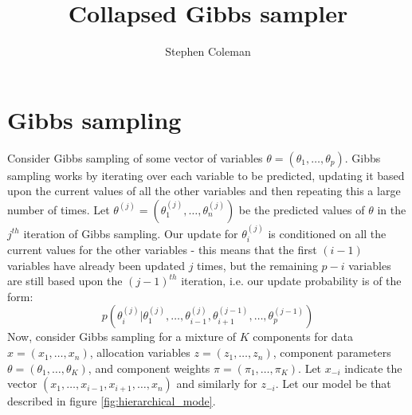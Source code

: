 \documentclass[12pt]{article} %
\title{Collapsed Gibbs sampler}
\author{Stephen Coleman}
\begin{document}
 
	\maketitle
	
	\section{Gibbs sampling}
	
	Consider Gibbs sampling of some vector of variables $\theta=(\theta_1,\ldots,\theta_p)$. Gibbs sampling works by iterating over each variable to be predicted, updating it based upon the current values of all the other variables and then repeating this a large number of times. Let $\theta^{(j)}=(\theta^{(j)}_1,\ldots,\theta^{(j)}_n)$ be the predicted values of $\theta$ in the $j^{th}$ iteration of Gibbs sampling. Our update for $\theta^{(j)}_i$ is conditioned on all the current values for the other variables - this means that the first $(i-1)$ variables have already been updated $j$ times, but the remaining $p - i$ variables are still based upon the $(j-1)^{th}$ iteration, i.e. our update probability is of the form:
	\[
	p\left(\theta^{(j)}_i | \theta^{(j)}_1,\ldots,\theta^{(j)}_{i-1},\theta^{(j-1)}_{i+1},\ldots, \theta^{(j - 1)}_p\right)
	\]
	Now, consider Gibbs sampling for a mixture of $K$ components for data $x=(x_1, \ldots, x_n)$, allocation variables $z=(z_1,\ldots,z_n)$, component parameters $\theta=(\theta_1,\ldots,\theta_K)$, and component weights $\pi=(\pi_1,\ldots,\pi_K)$. Let $x_{-i}$ indicate the vector $(x_1,\ldots,x_{i-1},x_{i+1},\ldots,x_n)$ and similarly for $z_{-i}$. Let our model be that described in figure \ref{fig:hierarchical_mode}.
	
\end{document}
